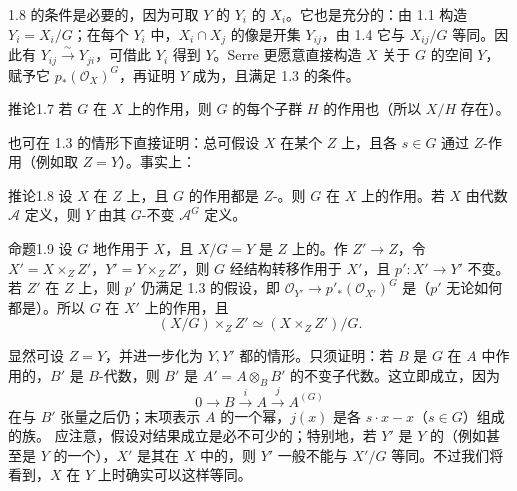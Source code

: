 1.8 的条件是必要的，因为可取 $Y$ 的 $Y_i$ 的 $X_i$。它也是充分的：由 1.1 构造 $Y_i=X_i/G$；在每个 $Y_i$ 中，$X_i\cap X_j$ 的像是开集 $Y_{ij}$，由 1.4 它与 $X_{ij}/G$ 等同。因此有 $Y_{ij}\xrightarrow{\sim}Y_{ji}$，可借此 $Y_i$ 得到 $Y$。Serre 更愿意直接构造 $X$ 关于 $G$ 的空间 $Y$，赋予它 $p_*(\mathcal O_X)^G$，再证明 $Y$ 成为，且满足 1.3 的条件。
\begin{SGAresult}{推论}{1.7}
若 $G$ 在 $X$ 上的作用，则 $G$ 的每个子群 $H$ 的作用也（所以 $X/H$ 存在）。
\end{SGAresult}
也可在 1.3 的情形下直接证明：总可假设 $X$ 在某个 $Z$ 上，且各 $s\in G$ 通过 $Z$-作用（例如取 $Z=Y$）。事实上：
\begin{SGAresult}{推论}{1.8}
设 $X$ 在 $Z$ 上，且 $G$ 的作用都是 $Z$-。则 $G$ 在 $X$ 上的作用。若 $X$ 由代数 $\mathcal A$ 定义，则 $Y$ 由其 $G$-不变 $\mathcal A^G$ 定义。
\end{SGAresult}
\begin{SGAresult}{命题}{1.9}
设 $G$ 地作用于 $X$，且 $X/G=Y$ 是 $Z$ 上的。作 $Z'\to Z$，令 $X'=X\times_ZZ'$，$Y'=Y\times_ZZ'$，则 $G$ 经结构转移作用于 $X'$，且 $p':X'\to Y'$ 不变。若 $Z'$ 在 $Z$ 上，则 $p'$ 仍满足 1.3 的假设，即 $\mathcal O_{Y'}\to p'_*(\mathcal O_{X'})^G$ 是（$p'$ 无论如何都是）。所以 $G$ 在 $X'$ 上的作用，且
\[(X/G)\times_ZZ'\simeq(X\times_ZZ')/G.\]
\end{SGAresult}
显然可设 $Z=Y$，并进一步化为 $Y,Y'$ 都的情形。只须证明：若 $B$ 是 $G$ 在 $A$ 中作用的，$B'$ 是 $B$-代数，则 $B'$ 是 $A'=A\otimes_BB'$ 的不变子代数。这立即成立，因为
\[0\longrightarrow B\xrightarrow{i}A\xrightarrow{j}A^{(G)}\]
在与 $B'$ 张量之后仍；末项表示 $A$ 的一个幂，$j(x)$ 是各 $s\cdot x-x$（$s\in G$）组成的族。
应注意，假设对结果成立是必不可少的；特别地，若 $Y'$ 是 $Y$ 的（例如甚至是 $Y$ 的一个），$X'$ 是其在 $X$ 中的，则 $Y'$ 一般不能与 $X'/G$ 等同。不过我们将看到，$X$ 在 $Y$ 上时确实可以这样等同。
